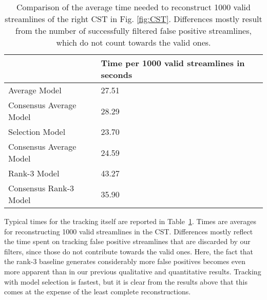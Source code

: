 \begin{table}
\centering
\begin{tabular}{p{4cm}p{3cm}}
	{}  & Time per 1000 valid streamlines in seconds\\ \hline  
	Average Model & 27.51\\
	Consensus Average Model & 28.29\\
	Selection Model & 23.70\\
	Consensus Average Model & 24.59 \\
	Rank-3 Model &  43.27\\
	Consensus Rank-3 Model & 35.90\\
\end{tabular}

\caption{Comparison of the average time needed to reconstruct 1000 valid streamlines of
  the right CST in Fig. \ref{fig:CST}. Differences mostly result from the number of successfully filtered false positive streamlines, which do not count towards the valid ones.}
	\label{tab:tracking-times}
\end{table}

Typical times for the tracking itself are reported in Table~\ref{tab:tracking-times}. Times are averages for reconstructing 1000 valid streamlines in the CST. Differences mostly reflect the time spent on tracking false positive streamlines that are discarded by our filters, since those do not contribute towards the valid ones. Here, the fact that the rank-3 baseline generates considerably more false positives becomes even more apparent than in our previous qualitative and quantitative results. Tracking with model selection is fastest, but it is clear from the results above that this comes at the expense of the least complete reconstructions.

